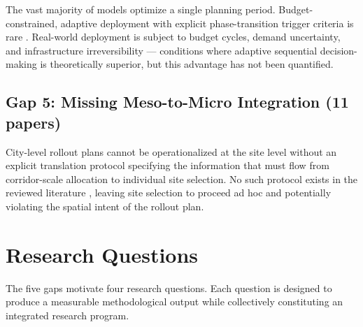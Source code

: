 \documentclass[12pt,letterpaper]{article}
\begin{document}
The vast majority of models optimize a single planning period.
Budget-constrained, adaptive deployment with explicit phase-transition
trigger criteria is rare \citep{zhang_tan2024,tang2025}.  Real-world
deployment is subject to budget cycles, demand uncertainty, and
infrastructure irreversibility --- conditions where adaptive sequential
decision-making is theoretically superior, but this advantage has not
been quantified.

\subsection{Gap 5: Missing Meso-to-Micro Integration (11 papers)}

City-level rollout plans cannot be operationalized at the site level
without an explicit translation protocol specifying the information that
must flow from corridor-scale allocation to individual site selection.
No such protocol exists in the reviewed literature \citep{do2025},
leaving site selection to proceed ad hoc and potentially violating the
spatial intent of the rollout plan.

\section{Research Questions}

The five gaps motivate four research questions.  Each question is
designed to produce a measurable methodological output while collectively
constituting an integrated research program.
\end{document}
